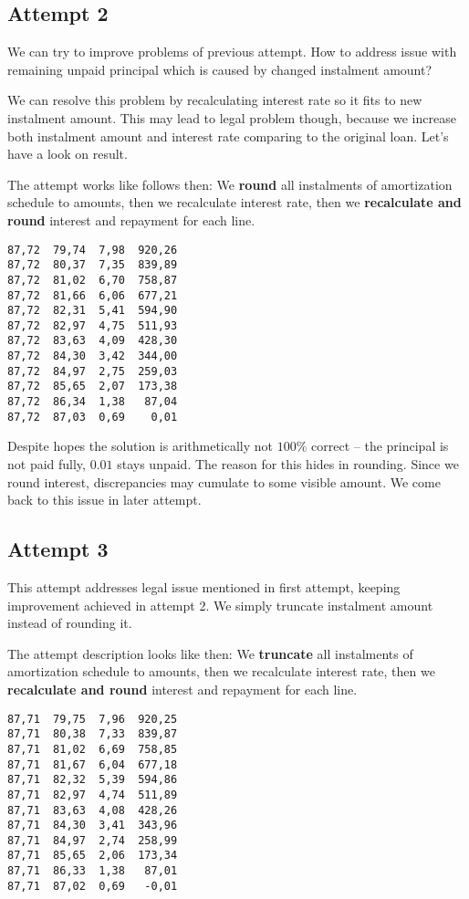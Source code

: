\documentclass[letterpaper,11pt]{article}
\begin{document}
\subsection {Attempt 2}
We can try to improve problems of previous attempt. How to address issue with remaining unpaid principal which is caused by changed instalment amount?

We can resolve this problem by recalculating interest rate so it fits to new instalment amount. This may lead to legal problem though, because we increase both instalment amount and interest rate comparing to the original loan. Let's have a look on result.

The attempt works like follows then:
We {\bf round} all instalments of amortization schedule to amounts,
then we recalculate interest rate,
then we {\bf recalculate and round} interest and repayment for each line.

\begin{verbatim}
87,72  79,74  7,98  920,26
87,72  80,37  7,35  839,89
87,72  81,02  6,70  758,87
87,72  81,66  6,06  677,21
87,72  82,31  5,41  594,90
87,72  82,97  4,75  511,93
87,72  83,63  4,09  428,30
87,72  84,30  3,42  344,00
87,72  84,97  2,75  259,03
87,72  85,65  2,07  173,38
87,72  86,34  1,38   87,04
87,72  87,03  0,69    0,01
\end{verbatim}

Despite hopes the solution is arithmetically not $100\%$ correct -- the principal is not paid fully, $0.01$ stays unpaid. The reason for this hides in rounding. Since we round interest, discrepancies may cumulate to some visible amount.
We come back to this issue in later attempt.


\subsection {Attempt 3}
This attempt addresses legal issue mentioned in first attempt, keeping improvement achieved in attempt 2. We simply truncate instalment amount instead of rounding it.

The attempt description looks like then:
We {\bf truncate} all instalments of amortization schedule to amounts,
then we recalculate interest rate,
then we {\bf recalculate and round} interest and repayment for each line.

\begin{verbatim}
87,71  79,75  7,96  920,25
87,71  80,38  7,33  839,87
87,71  81,02  6,69  758,85
87,71  81,67  6,04  677,18
87,71  82,32  5,39  594,86
87,71  82,97  4,74  511,89
87,71  83,63  4,08  428,26
87,71  84,30  3,41  343,96
87,71  84,97  2,74  258,99
87,71  85,65  2,06  173,34
87,71  86,33  1,38   87,01
87,71  87,02  0,69   -0,01
\end{verbatim}
\end{document}
